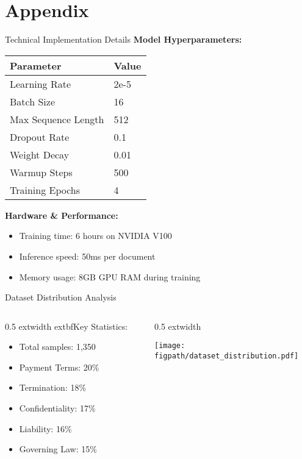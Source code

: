 
\section{Appendix}

\begin{frame}{Technical Implementation Details}
\textbf{Model Hyperparameters:}
\begin{table}[h]
\centering
\begin{tabular}{@{}ll@{}}
\toprule
\textbf{Parameter} & \textbf{Value} \\
\midrule
Learning Rate & 2e-5 \\
Batch Size & 16 \\
Max Sequence Length & 512 \\
Dropout Rate & 0.1 \\
Weight Decay & 0.01 \\
Warmup Steps & 500 \\
Training Epochs & 4 \\
\bottomrule
\end{tabular}
\end{table}

\vspace{0.5cm}
\textbf{Hardware \& Performance:}
\begin{itemize}
    \item Training time: 6 hours on NVIDIA V100
    \item Inference speed: 50ms per document
    \item Memory usage: 8GB GPU RAM during training
\end{itemize}
\end{frame}

\begin{frame}{Dataset Distribution Analysis}
\begin{columns}
\begin{column}{0.5	extwidth}
	extbf{Key Statistics:}
\begin{itemize}
    \item Total samples: 1,350
    \item Payment Terms: 20\%
    \item Termination: 18\%
    \item Confidentiality: 17\%
    \item Liability: 16\%
    \item Governing Law: 15\%
\end{itemize}
\end{column}
\begin{column}{0.5	extwidth}
\begin{center}
\texttt{[image: \\figpath/dataset\_distribution.pdf]}
\end{center}
\end{column}
\end{columns}
\end{frame}

